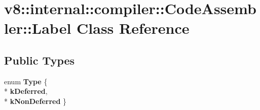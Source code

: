 \hypertarget{classv8_1_1internal_1_1compiler_1_1_code_assembler_1_1_label}{}\section{v8\+:\+:internal\+:\+:compiler\+:\+:Code\+Assembler\+:\+:Label Class Reference}
\label{classv8_1_1internal_1_1compiler_1_1_code_assembler_1_1_label}
\subsection*{Public Types}
\begin{DoxyCompactItemize}
\item 
enum {\bfseries Type} \{ \\*
{\bfseries k\+Deferred}, 
\\*
{\bfseries k\+Non\+Deferred}
 \}\hypertarget{classv8_1_1internal_1_1compiler_1_1_code_assembler_1_1_label_a0c551e2d403edb293dd3dc74232fbb8e}{}\label{classv8_1_1internal_1_1compiler_1_1_code_assembler_1_1_label_a0c551e2d403edb293dd3dc74232fbb8e}

\end{DoxyCompactItemize}
